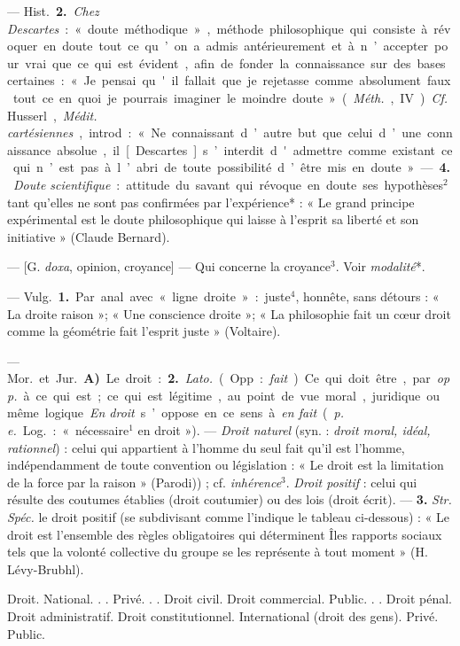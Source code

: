 \begin{itemize}[leftmargin=1cm, label=, itemsep=1pt]
— \si{Hist.} {\bf 2.} {\it Chez Descartes} : « doute
méthodique », méthode philosophique qui consiste à révoquer en
doute tout ce qu’on a admis antérieurement et à n’accepter pour vrai
que ce qui est évident, afin de fonder
la connaissance sur des bases certaines : « Je pensai qu'il fallait que
je rejetasse comme absolument faux
tout ce en quoi je pourrais imaginer
le moindre doute » ({\it Méth.}, IV). {\it Cf.}
Husserl, {\it Médit. cartésiennes}, introd. :
« Ne connaissant d’autre but que
celui d’une connaissance absolue,
il [Descartes] s’interdit d'admettre
comme existant ce qui n’est pas à
l’abri de toute possibilité d’être mis
en doute ». — {\bf 4.} {\it Doute scientifique} :
attitude du savant qui révoque en
doute ses hypothèses$^2$ tant qu’elles
ne sont pas confirmées par l’expérience* : « Le grand principe expérimental est le doute philosophique
qui laisse à l’esprit sa liberté et son
initiative » (Claude Bernard).

 — [G. {\it doxa}, opinion, croyance]
— Qui concerne la croyance$^3$. Voir
{\it modalité}*.

 — \si{Vulg.} {\bf 1.} Par anal. avec
« ligne droite » : juste$^4$, honnête, sans
détours : « La droite raison »; « Une
conscience droite »; « La philosophie
fait un cœur droit comme la géométrie fait l'esprit juste » (Voltaire).

 — \si{Mor.} et \si{Jur.} {\bf A)} Le
droit : {\bf 2.} {\it Lato.} (Opp. : {\it fait}). Ce qui
doit être, par {\it opp.} à ce qui est; ce
qui est légitime, au point de vue
moral, juridique ou même logique.
{\it En droit} s’oppose en ce sens à {\it en fait}
({\it p. e.} \si{Log.} : « nécessaire$^1$ en droit »).
— {\it Droit naturel} (syn. : {\it droit moral,
idéal, rationnel}) : celui qui appartient
à l’homme du seul fait qu'il est
l’homme, indépendamment de toute
convention ou législation : « Le droit
est la limitation de la force par la
raison » (Parodi)) ; cf. {\it inhérence}$^3$. {\it Droit
positif} : celui qui résulte des coutumes établies (droit coutumier) ou
des lois (droit écrit). — {\bf 3.} {\it Str.} {\it Spéc.}
le droit positif (se subdivisant comme
l'indique le tableau ci-dessous) :
« Le droit est l’ensemble des règles
obligatoires qui déterminent Îles
rapports sociaux tels que la volonté
collective du groupe se les représente
à tout moment » (H. Lévy-Brubhl).

Droit.
 National. . .
  Privé. . .
   Droit civil.
   Droit commercial.
  Public. . .
   Droit pénal.
   Droit administratif.
   Droit constitutionnel.
 International (droit des gens).
  Privé.
  Public.


\end{itemize}
